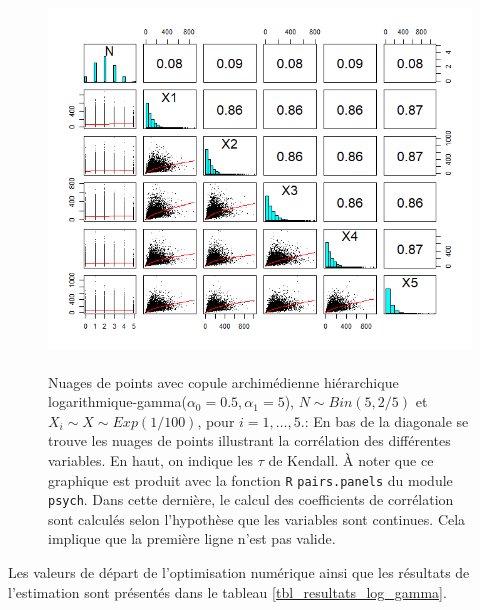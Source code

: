 \documentclass{article}
\begin{document}
		\begin{figure}[H]
			\centering
			\includegraphics[height=10cm]{Graph/scatterplot_log_gamma.png}
			\caption[Nuages de points du scénario \ref{scenario_log_gamma}]
			{Nuages de points avec copule archimédienne hiérarchique logarithmique-gamma($\alpha_0=0.5, \alpha_1 = 5$), $N \sim Bin(5, 2/5)$ et $X_i \sim X \sim Exp(1/100)$, pour $i=1,\dots, 5$.:
				En bas de la diagonale se trouve les nuages de points illustrant la corrélation des différentes variables. En haut, on indique les $\tau$ de Kendall. À noter que ce graphique est produit avec la fonction \texttt{R} \texttt{pairs.panels} du module \texttt{psych}. Dans cette dernière, le calcul des coefficients de corrélation sont calculés selon l'hypothèse que les variables sont continues. Cela implique que la première ligne n'est pas valide.}
			\label{graph_scatterplot_log_gamma}
		\end{figure}

		Les valeurs de départ de l'optimisation numérique ainsi que les résultats de l'estimation sont présentés dans le tableau \ref{tbl_resultats_log_gamma}.
	
\end{document}
